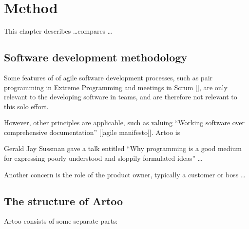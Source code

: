 \chapter{Method}

This chapter describes \ldots compares \ldots


\section{Software development methodology}

Some features of of agile software development processes, such as pair programming in Extreme Programming \cite{xpparr} and meetings in Scrum [], are only relevant to the developing software in teams, and are therefore not relevant to this solo effort. \ldot

However, other principles are applicable, such as valuing ``Working software over comprehensive documentation'' [[agile manifesto]]. Artoo is 

Gerald Jay Sussman gave a talk entitled ``Why programming is a good medium for expressing poorly understood and sloppily formulated ideas'' \ldots


Another concern is the role of the product owner, typically a customer or boss \ldots 





\section{The structure of Artoo}

Artoo consists of some separate parts:

